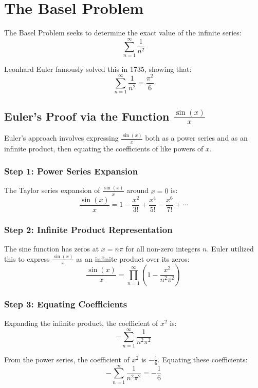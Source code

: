 \section{The Basel Problem}

The Basel Problem seeks to determine the exact value of the infinite series:
\[
\sum_{n=1}^{\infty} \frac{1}{n^2}
\]

Leonhard Euler famously solved this in 1735, showing that:
\[
\sum_{n=1}^{\infty} \frac{1}{n^2} = \frac{\pi^2}{6}
\]

\subsection{Euler's Proof via the Function \( \frac{\sin(x)}{x} \)}

Euler's approach involves expressing \( \frac{\sin(x)}{x} \) both as a power series and as an infinite product, then equating the coefficients of like powers of \( x \).

\subsubsection*{Step 1: Power Series Expansion}

The Taylor series expansion of \( \frac{\sin(x)}{x} \) around \( x = 0 \) is:
\[
\frac{\sin(x)}{x} = 1 - \frac{x^2}{3!} + \frac{x^4}{5!} - \frac{x^6}{7!} + \cdots
\]

\subsubsection*{Step 2: Infinite Product Representation}

The sine function has zeros at \( x = n\pi \) for all non-zero integers \( n \). Euler utilized this to express \( \frac{\sin(x)}{x} \) as an infinite product over its zeros:
\[
\frac{\sin(x)}{x} = \prod_{n=1}^{\infty} \left(1 - \frac{x^2}{n^2\pi^2}\right)
\]

\subsubsection*{Step 3: Equating Coefficients}

Expanding the infinite product, the coefficient of \( x^2 \) is:
\[
-\sum_{n=1}^{\infty} \frac{1}{n^2\pi^2}
\]

From the power series, the coefficient of \( x^2 \) is \( -\frac{1}{6} \). Equating these coefficients:
\[
-\sum_{n=1}^{\infty} \frac{1}{n^2\pi^2} = -\frac{1}{6}
\]

